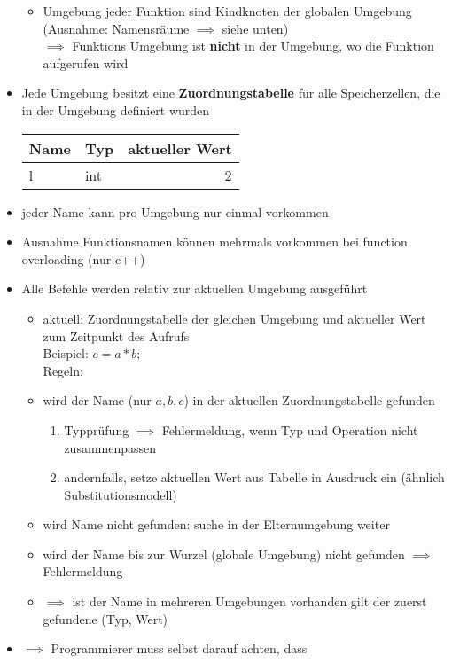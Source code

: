 \documentclass[a4paper]{scrartcl}
\theoremstyle{definition}
\theoremstyle{plain}
\theoremstyle{remark}
\theoremstyle{remark}
\begin{document}
\begin{itemize}
\begin{itemize}
\item Umgebung jeder Funktion sind Kindknoten der globalen Umgebung (Ausnahme: Namensräume $\implies$ siehe unten) \\
          $\implies$ Funktions Umgebung ist \textbf{nicht} in der Umgebung, wo die Funktion aufgerufen wird
\end{itemize}
\item Jede Umgebung besitzt eine \textbf{Zuordnungstabelle} für alle Speicherzellen, die in der Umgebung definiert wurden
\begin{center}
\begin{tabular}{llr}
Name & Typ & aktueller Wert\\
\hline
l & int & 2\\
\end{tabular}
\end{center}
\item jeder Name kann pro Umgebung nur einmal vorkommen
\item Ausnahme Funktionsnamen können mehrmals vorkommen bei function overloading (nur c++)
\item Alle Befehle werden relativ zur aktuellen Umgebung ausgeführt
\begin{itemize}
\item aktuell: Zuordnungstabelle der gleichen Umgebung und aktueller Wert zum Zeitpunkt des Aufrufs \\
          Beispiel: $c = a * b;$ \\
          Regeln:
\item wird der Name (nur $a, b, c$) in der aktuellen Zuordnungstabelle gefunden
\begin{enumerate}
\item Typprüfung $\implies$ Fehlermeldung, wenn Typ und Operation nicht zusammenpassen
\item andernfalls, setze aktuellen Wert aus Tabelle in Ausdruck ein (ähnlich Substitutionsmodell)
\end{enumerate}
\item wird Name nicht gefunden: suche in der Elternumgebung weiter
\item wird der Name bis zur Wurzel (globale Umgebung) nicht gefunden $\implies$ Fehlermeldung
\item $\implies$ ist der Name in mehreren Umgebungen vorhanden gilt der zuerst gefundene (Typ, Wert)
\end{itemize}
\item $\implies$ Programmierer muss selbst darauf achten, dass

\end{itemize}
\end{document}
